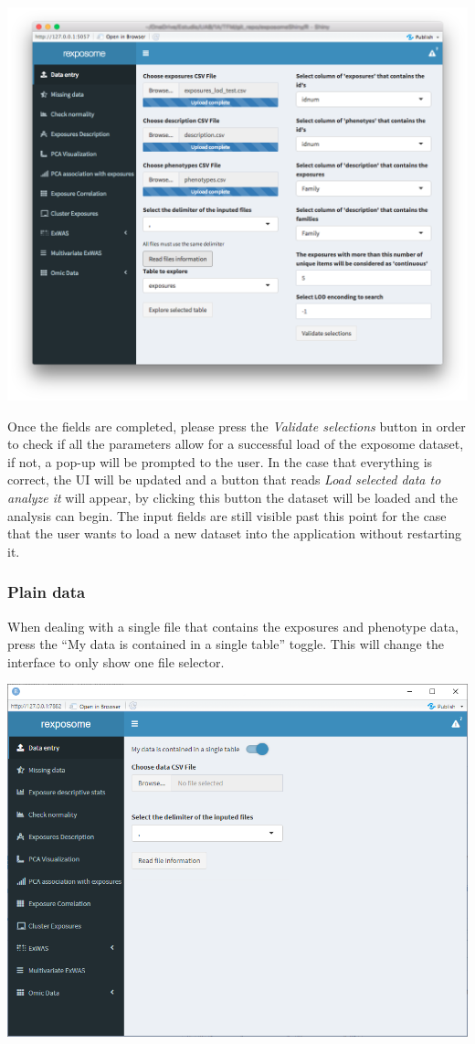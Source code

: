 \documentclass[
]{book}
\begin{document}
\includegraphics{images/analysis1_2_2.png}

Once the fields are completed, please press the \emph{Validate selections} button in order to check if all the parameters allow for a successful load of the exposome dataset, if not, a pop-up will be prompted to the user. In the case that everything is correct, the UI will be updated and a button that reads \emph{Load selected data to analyze it} will appear, by clicking this button the dataset will be loaded and the analysis can begin. The input fields are still visible past this point for the case that the user wants to load a new dataset into the application without restarting it.

\hypertarget{plain_data}{%
\subsubsection{Plain data}\label{plain_data}}

When dealing with a single file that contains the exposures and phenotype data, press the ``My data is contained in a single table'' toggle. This will change the interface to only show one file selector.

\includegraphics{images/plain_table_1.png}
\end{document}
